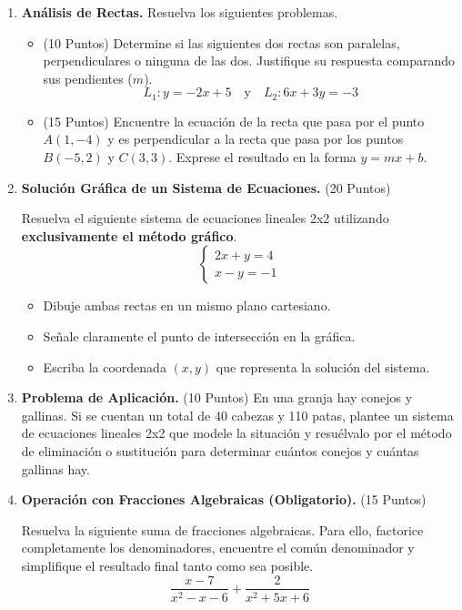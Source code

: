 \documentclass[12pt]{article}
\begin{document}
\begin{enumerate}
    \vspace{0.5cm}

    \item \textbf{Análisis de Rectas.} Resuelva los siguientes problemas.

    \begin{itemize}
        \item[a)] (10 Puntos) Determine si las siguientes dos rectas son paralelas, perpendiculares o ninguna de las dos. Justifique su respuesta comparando sus pendientes ($m$).
        \[ L_1: y = -2x + 5 \quad \text{y} \quad L_2: 6x + 3y = -3 \]

        \item[b)] (15 Puntos) Encuentre la ecuación de la recta que pasa por el punto $A(1, -4)$ y es perpendicular a la recta que pasa por los puntos $B(-5, 2)$ y $C(3, 3)$. Exprese el resultado en la forma $y=mx+b$.
    \end{itemize}

    \vspace{0.5cm}

    \item \textbf{Solución Gráfica de un Sistema de Ecuaciones.} (20 Puntos)

    Resuelva el siguiente sistema de ecuaciones lineales 2x2 utilizando \textbf{exclusivamente el método gráfico}.
    \[
    \begin{cases}
    2x + y = 4 \\
    x - y = -1
    \end{cases}
    \]

    \begin{itemize}
        \item Dibuje ambas rectas en un mismo plano cartesiano.
        \item Señale claramente el punto de intersección en la gráfica.
        \item Escriba la coordenada $(x, y)$ que representa la solución del sistema.
    \end{itemize}

    \item \textbf{Problema de Aplicación.} (10 Puntos) En una granja hay conejos y gallinas. Si se cuentan un total de 40 cabezas y 110 patas, plantee un sistema de ecuaciones lineales 2x2 que modele la situación y resuélvalo por el método de eliminación o sustitución para determinar cuántos conejos y cuántas gallinas hay.


    \item \textbf{Operación con Fracciones Algebraicas (Obligatorio).} (15 Puntos)

    Resuelva la siguiente suma de fracciones algebraicas. Para ello, factorice completamente los denominadores, encuentre el común denominador y simplifique el resultado final tanto como sea posible.
    \[
    \frac{x - 7}{x^2 - x - 6} + \frac{2}{x^2 + 5x + 6}
    \]
\end{enumerate}



\end{document}
